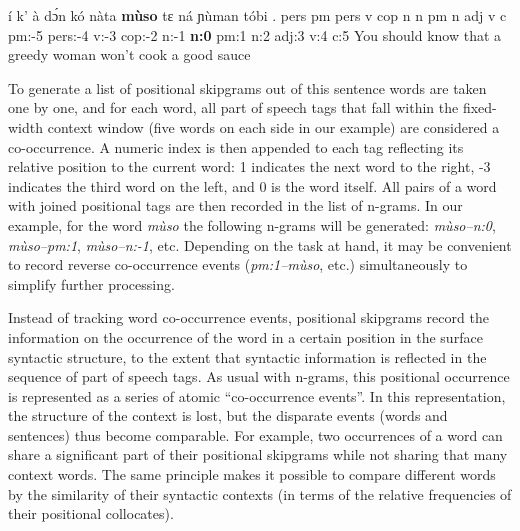 \documentclass[12pt]{article}
\begin{document}
\begin{example}
  \small
  \label{ex:muso}
  \trigloss
  {í       k'      à       dɔ́n     kó      nàta    \textbf{mùso}    tɛ      ná      ɲùman   tóbi    .}
  {pers    pm      pers    v       cop     n       n       pm      n       adj     v       c}
  {{} pm:-5 pers:-4 v:-3 cop:-2 n:-1 \textbf{n:0} pm:1 n:2 adj:3 v:4 c:5}
  {You should know that a greedy woman won't cook a good sauce}
\end{example}

To generate a list of positional skipgrams out of this sentence words
are taken one by one, and for each word, all part of speech tags that
fall within the fixed-width context window (five words on each side in
our example) are considered a co-occurrence. A numeric index is then
appended to each tag reflecting its relative position to the current
word: 1 indicates the next word to the right, -3 indicates the third
word on the left, and 0 is the word itself. All pairs of a word
with joined positional tags are then recorded in the list of
n-grams. In our example, for the word \textit{mùso} the following
n-grams will be generated: \textit{mùso--n:0}, \textit{mùso--pm:1},
\textit{mùso--n:-1}, etc.  Depending on the task at hand, it may be
convenient to record reverse co-occurrence events (\textit{pm:1--mùso},
etc.) simultaneously to simplify further processing.

Instead of tracking word co-occurrence events, positional skipgrams
record the information on the occurrence of the word in a certain
position in the surface syntactic structure, to the extent that
syntactic information is reflected in the sequence of part of speech
tags. As usual with n-grams, this positional occurrence is represented
as a series of atomic “co-occurrence events”. In this representation,
the structure of the context is lost, but the disparate events (words
and sentences) thus become comparable. For example, two occurrences of
a word can share a significant part of their positional skipgrams
while not sharing that many context words. The same principle makes it
possible to compare different words by the similarity of their
syntactic contexts (in terms of the relative frequencies of their
positional collocates).


\end{document}
